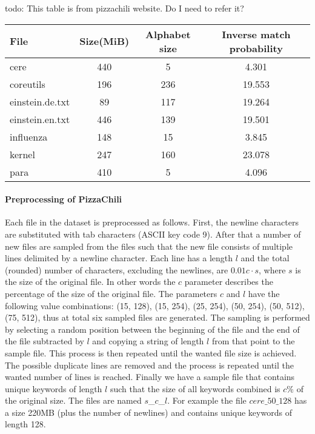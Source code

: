 \documentclass[english,twoside,censored,csm,algorithms-track-2020]{HYthesisML}
\theoremstyle{plain}
\theoremstyle{definition}
\begin{document}
todo: This table is from pizzachili website. Do I need to refer it?

\begin{center}
  \begin{tabular}{|l|c|c|c|}
    \hline
    \textbf{File} & \textbf{Size(MiB)} & \textbf{Alphabet size} & \textbf{Inverse match probability} \\
    \hline
    cere & 440 & 5 & 4.301 \\
    coreutils & 196 & 236 & 19.553 \\
    einstein.de.txt & 89 & 117 & 19.264 \\
    einstein.en.txt & 446 & 139 & 19.501 \\
    influenza & 148 & 15 & 3.845 \\
    kernel & 247 & 160 & 23.078 \\
    para & 410 & 5 & 4.096\\
    \hline
  \end{tabular}
\end{center}

\paragraph{Preprocessing of PizzaChili}
Each file in the dataset is preprocessed as follows. First, the newline characters are substituted
with tab characters (ASCII key code 9). After that a number of new files are sampled from the files
such that the new file consists of multiple lines delimited by a newline character. Each line has a
length $l$ and the total (rounded) number of characters, excluding the newlines, are $0.01c\cdot s$,
where $s$ is the size of the original file. In other words the $c$ parameter describes the percentage
of the size of the original file. The parameters $c$ and $l$ have the following value
combinations: (15, 128), (15, 254), (25, 254), (50, 254), (50, 512), (75, 512), thus at total six
sampled files are generated. The sampling is performed by selecting a random position between
the beginning of the file and the end of the file subtracted by $l$ and copying a string of length
$l$ from that point to the sample file. This process is then repeated until the wanted file size is
achieved. The possible duplicate lines are removed and the process is repeated until the wanted
number of lines is reached. Finally we have a sample file that contains unique keywords of length
$l$ such that the size of all keywords combined is $c\%$ of the original size. The files are
named $s$\_$c$\_$l$. For example the file $cere\_50\_128$ has a size 220MB (plus the number of newlines)
and contains unique keywords of length 128.
\end{document}
